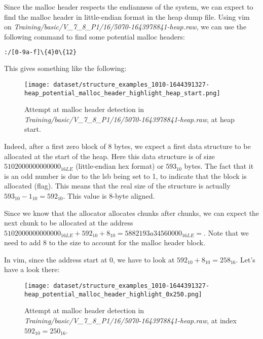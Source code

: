     Since the malloc header respects the endianness of the system, we can expect to find the malloc header in little-endian format in the heap dump file. Using vim on \textit{Training/basic/V\_7\_8\_P1/16/5070-1643978841-heap.raw}, we can use the following command to find some potential malloc headers:

    \begin{lstlisting}[language=bash, caption={Vim command to find potential malloc headers}]
        :/[0-9a-f]\{4}0\{12}
    \end{lstlisting}
    
    This gives something like the following:

    \begin{figure}[H]
        \centering
        \texttt{[image: dataset/structure\_examples\_1010-1644391327-heap\_potential\_malloc\_header\_highlight\_heap\_start.png]}
        \caption{Attempt at malloc header detection in \textit{Training/basic/V\_7\_8\_P1/16/5070-1643978841-heap.raw}, at heap start.}
    \end{figure}

    Indeed, after a first zero block of 8 bytes, we expect a first data structure to be allocated at the start of the heap. Here this data structure is of size $ 5102000000000000_{16LE} $ (little-endian hex format) or $ 593_{10} $ bytes. The fact that it is an odd number is due to the \acrshort{lsb} being set to 1, to indicate that the block is allocated (flag). This means that the real size of the structure is actually $ 593_{10} - 1_{10} = 592_{10} $. This value is 8-byte aligned.

    Since we know that the allocator allocates chunks after chunks, we can expect the next chunk to be allocated at the address $ 5102000000000000_{16LE} + 592_{10} + 8_{10} = 5882193a34560000_{16LE} =  $. Note that we need to add 8 to the size to account for the malloc header block.
    
    In vim, since the address start at 0, we have to look at $ 592_{10} + 8_{10} = 258_{16} $. Let's have a look there:

    \begin{figure}[H]
        \centering
        \texttt{[image: dataset/structure\_examples\_1010-1644391327-heap\_potential\_malloc\_header\_highlight\_0x250.png]}
        \caption{Attempt at malloc header detection in \textit{Training/basic/V\_7\_8\_P1/16/5070-1643978841-heap.raw}, at index $ 592_{10} = 250_{16} $.}
    \end{figure}


